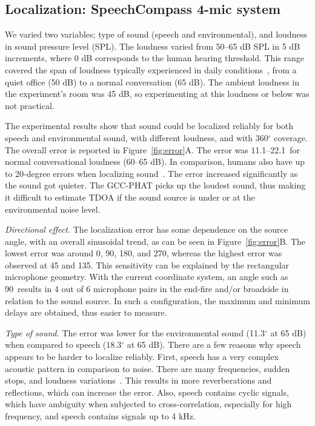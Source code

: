 \subsection{Localization: SpeechCompass 4-mic system} 

We varied two variables; type of sound (speech and environmental), and loudness in sound pressure level (SPL). 
The loudness varied from 50--65 dB SPL in 5 dB increments, where 0 dB corresponds to the human hearing threshold. This range covered the span of loudness typically experienced in daily conditions~\cite{db_chart}, from a quiet office (50 dB) to a normal conversation (65 dB). The ambient loudness in the experiment's room was 45 dB, so experimenting at this loudness or below was not practical. 


The experimental results show that sound could be localized reliably for both speech and environmental sound, with different loudness, and with 360$^{\circ}$ coverage. The overall error is reported in Figure~\ref{fig:error}A. The error was 11.1--22.1\textdegree~for normal conversational loudness (60--65 dB). In comparison, humans also have up to 20-degree errors when localizing sound~\cite{human_localization_error}. The error increased significantly as the sound got quieter. The GCC-PHAT picks up the loudest sound, thus making it difficult to estimate TDOA if the sound source is under or at the environmental noise level. 

\textit{Directional effect.}
The localization error has some dependence on the source angle, with an overall sinusoidal trend, as can be seen in Figure~\ref{fig:error}B. The lowest error was around 0, 90, 180, and 270\textdegree, whereas the highest error was observed at 45 and 135\textdegree. This sensitivity can be explained by the rectangular microphone geometry. With the current coordinate system, an angle such as 90\textdegree~results in 4 out of 6 microphone pairs in the end-fire and/or broadside in relation to the sound source. In such a configuration, the maximum and minimum delays are obtained, thus easier to measure. 

\textit{Type of sound.}
The error was lower for the environmental sound (11.3$^{\circ}$ at 65 dB) when compared to speech (18.3$^{\circ}$ at 65 dB). There are a few reasons why speech appears to be harder to localize reliably. First, speech has a very complex acoustic pattern in comparison to noise. There are many frequencies, sudden stops, and loudness variations~\cite{wilder1975articulatory}. This results in more reverberations and reflections, which can increase the error. Also, speech contains cyclic signals, which have ambiguity when subjected to cross-correlation, especially for high frequency, and speech contains signals up to 4 kHz. 

